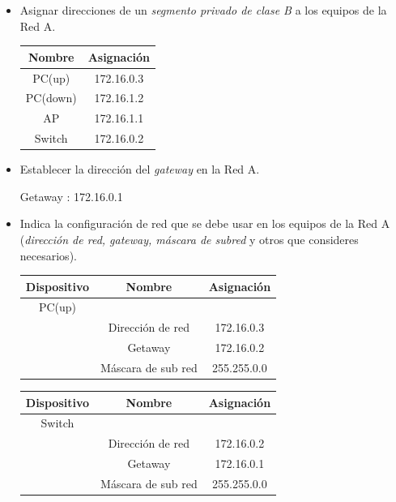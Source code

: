 \documentclass[spanish,12pt,letterpaper]{article}
\begin{document}
\begin{itemize}
  
\item Asignar direcciones de un \textit{segmento privado de clase B} a los
  equipos de la Red A.

  \begin{table}[H]
    \centering
    \begin{tabular}{|c | c |}\hline
      Nombre & Asignación     \\ \hline
      PC(up) & 172.16.0.3     \\ \hline
      PC(down) & 172.16.1.2   \\ \hline    
      AP & 172.16.1.1         \\ \hline
      Switch & 172.16.0.2     \\ \hline
    \end{tabular}
  \end{table}

\item Establecer la dirección del \textit{gateway} en la Red A.

  Getaway : 172.16.0.1
  
\item Indica la configuración de red que se debe usar en los equipos de la Red A
  (\textit{dirección de red, gateway, máscara de subred} y otros que consideres
  necesarios).

  \begin{table}[H]
    \centering
    \begin{tabular}{| c | c | c |}\hline
      Dispositivo & Nombre & Asignación\\ \hline
      PC(up) & & \\ \hline
      & Dirección de red & 172.16.0.3 \\ \hline
      & Getaway & 172.16.0.2 \\ \hline
      & Máscara de sub red & 255.255.0.0 \\ \hline
    \end{tabular}
  \end{table}

  \begin{table}[H]
    \centering
    \begin{tabular}{| c | c | c |}\hline
      Dispositivo & Nombre & Asignación\\ \hline
      Switch & & \\ \hline
      & Dirección de red & 172.16.0.2 \\ \hline
      & Getaway & 172.16.0.1 \\ \hline
      & Máscara de sub red & 255.255.0.0 \\ \hline
    \end{tabular}
  \end{table}


\end{itemize}
\end{document}
